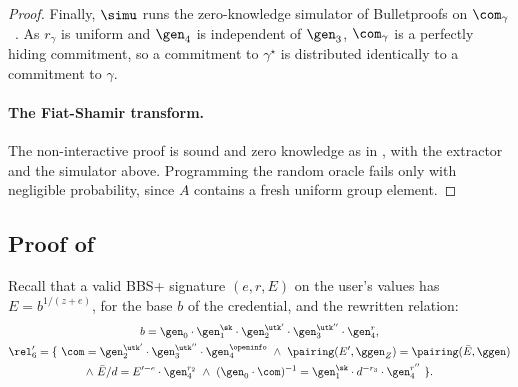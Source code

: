 \begin{proof}
  Finally, $\simu$ runs the zero-knowledge simulator of
Bulletproofs on $\com_\gamma$~\cite{SP:BBBPWM18}. As $r_\gamma$ is uniform and
$\gen_4$ is independent of $\gen_3$, $\com_\gamma$ is a perfectly hiding
commitment, so a commitment to $\gamma^\star$ is distributed identically to a
commitment to $\gamma$.

  \paragraph{The Fiat-Shamir transform.} The non-interactive proof is sound and
zero knowledge as in , with the extractor and the
simulator above. Programming the random oracle fails only with negligible
probability, since $A$ contains a fresh uniform group element.

\end{proof}

\subsection{Proof of }\label{sec:rel6-equiv}

Recall that a valid BBS+ signature $(e, r, E)$ on the user's values has $E =
b^{1/(z+e)}$, for the base $b$ of the credential, and the rewritten relation:
%
\begin{equation*} \begin{gathered}
  b = \gen_0\cdot\gen_1^{\sk}\cdot\gen_2^{\utk'}\cdot\gen_3^{\utk''}\cdot
\gen_4^{r}, \\
  \rel_6' = \{\ \com = \gen_2^{\utk'}\cdot\gen_3^{\utk''}\cdot\gen_4^{\openinfo}\
\wedge \ \pairing(E', \ggen_Z) = \pairing(\bar{E}, \ggen) \\ \wedge \ \bar{E}/d
= E'^{-e}\cdot\gen_4^{r_2} \ \wedge \ (\gen_0\cdot\com)^{-1} =
\gen_1^{\sk}\cdot d^{-r_3}\cdot\gen_4^{r''}\ \}.
\end{gathered} \end{equation*}

